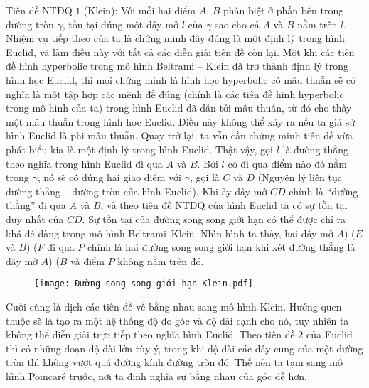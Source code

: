 \documentclass{article}
\begin{document}
	\vskip 0.1cm
	Tiên đề NTĐQ $1$ (Klein): Với mỗi hai điểm $A$, $B$ phân biệt ở phần bên trong đường tròn $\gamma$, tồn tại đúng một dây mở $l$ của $\gamma$ sao cho cả $A$ và $B$ nằm trên $l$.
	\vskip 0.1cm
	Nhiệm vụ tiếp theo của ta là chứng minh đây đúng là một định lý trong hình Euclid, và làm điều này với tất cả các diễn giải tiên đề còn lại. Một khi các tiên đề hình hyperbolic trong mô hình Beltrami -- Klein đã trở thành định lý trong hình học Euclid, thì mọi chứng minh là hình học hyperbolic có mâu thuẫn sẽ có nghĩa là một tập hợp các mệnh đề đúng (chính là các tiên đề hình hyperbolic trong mô hình của ta) trong hình Euclid đã dẫn tới mâu thuẫn, từ đó cho thấy một mâu thuẫn trong hình học Euclid. Điều này không thể xảy ra nếu ta giả sử hình Euclid là phi mâu thuẫn.
	Quay trở lại, ta vẫn cần chứng minh tiên đề vừa phát biểu kia là một định lý trong hình Euclid.
	Thật vậy, gọi $l$ là đường thẳng theo nghĩa trong hình Euclid đi qua $A$ và $B$. Bởi $l$ có đi qua điểm nào đó nằm trong $\gamma$, nó sẽ có đúng hai giao điểm với $\gamma$, gọi là $C$ và $D$ (Nguyên lý liên tục đường thẳng -- đường tròn của hình Euclid). Khi ấy dây mở $CD$ chính là ``đường thẳng'' đi qua $A$ và $B$, và theo tiên đề NTĐQ của hình Euclid ta có sự tồn tại duy nhất của $CD$.
	\vskip 0.1cm
	Sự tồn tại của  đường song song giới hạn có thể được chỉ ra khá dễ dàng trong mô hình Beltrami--Klein. Nhìn hình ta thấy, hai dây mở $A$) ($E$ và $B$) ($F$ đi qua $P$ chính là hai đường song song giới hạn khi xét đường thẳng là dây mở $A$) ($B$ và điểm $P$ không nằm trên đó.
	\begin{figure}[H]
		\vspace*{-5pt}
		\centering
		\captionsetup{labelformat= empty, justification=centering}
		\texttt{[image: Đường song song giới hạn Klein.pdf]}
		\vspace*{-10pt}
	\end{figure}
	Cuối cùng là dịch các tiên đề về bằng nhau sang mô hình Klein. Hướng quen thuộc sẽ là tạo ra một hệ thống độ đo góc và độ dài cạnh cho nó, tuy nhiên ta không thể diễn giải trực tiếp theo nghĩa hình Euclid. Theo tiên đề $2$ của Euclid thì có những đoạn độ dài lớn tùy ý, trong khi độ dài các dây cung của một đường tròn thì không vượt quá đường kính đường tròn đó.
	Thế nên ta tạm sang mô hình Poincaré trước, nơi ta định nghĩa sự bằng nhau của góc dễ hơn. 
\end{document}
